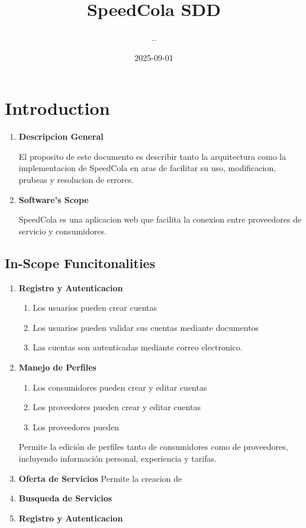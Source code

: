 \documentclass{article}
\title{SpeedCola SDD}
\date{2025-09-01}
\author{..}
\begin{document}
\maketitle
\newpage
{}

\section{Introduction}
  \begin{enumerate}
    \item  \textbf{Descripcion General}

  El proposito de este documento es describir tanto la arquitectura como la implementacion de 
  SpeedCola en aras de facilitar su uso, modificacion, prubeas y resolucion de errores.

  \item \textbf{Software's Scope}

  SpeedCola es una aplicacion web que facilita la conexion entre proveedores de servicio y consumidores.

  \end{enumerate}

  \subsection{In-Scope Funcitonalities}
    \begin{enumerate}
      \item \textbf{Registro y Autenticacion}
        \begin{enumerate}
          \item Los usuarios pueden crear cuentas
          \item Los usuarios pueden validar sus cuentas mediante documentos
          \item Las cuentas son autenticadas mediante correo electronico.
        \end{enumerate}
      \item \textbf{Manejo de Perfiles}
        \begin{enumerate}
          \item Los consumidores pueden crear y editar cuentas
          \item Los proveedores pueden crear  y editar cuentas
          \item Los proveedores pueden 
        \end{enumerate}
      Permite la edición de perfiles tanto de consumidores como de 
      proveedores, incluyendo información personal, experiencia y tarifas.  
      \item \textbf{Oferta de Servicios}
        Permite la creacion de 
      \item \textbf{Busqueda de Servicios}
      \item \textbf{Registro y Autenticacion}
    \end{enumerate}
\end{document}
